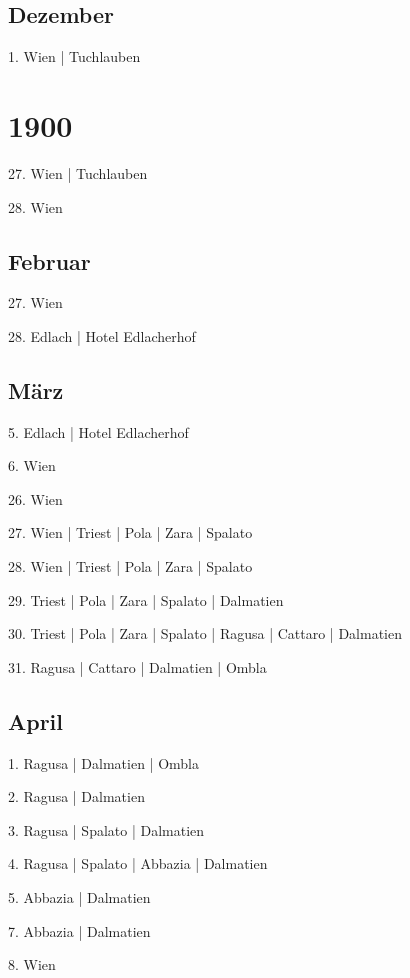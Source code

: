 \documentclass[twoside=false,titlepage=false,open=any, parskip=never, fontsize=10pt, headings=small, chapterprefix=false, appendixprefix=false, DIV=15]{scrbook}
\begin{document}
\begin{multicols}{3}
            \section*{Dezember}
            1. Wien | Tuchlauben\par
            \chapter*{1900}
            27. Wien | Tuchlauben\par
            28. Wien\par
            \section*{Februar}
            27. Wien\par
            28. Edlach | Hotel Edlacherhof\par
            \section*{März}
            5. Edlach | Hotel Edlacherhof\par
            6. Wien\par
            26. Wien\par
            27. Wien | Triest | Pola | Zara | Spalato\par
            28. Wien | Triest | Pola | Zara | Spalato\par
            29. Triest | Pola | Zara | Spalato | Dalmatien\par
            30. Triest | Pola | Zara | Spalato | Ragusa | Cattaro | Dalmatien\par
            31. Ragusa | Cattaro | Dalmatien | Ombla\par
            \section*{April}
            1. Ragusa | Dalmatien | Ombla\par
            2. Ragusa | Dalmatien\par
            3. Ragusa | Spalato | Dalmatien\par
            4. Ragusa | Spalato | Abbazia | Dalmatien\par
            5. Abbazia | Dalmatien\par
            7. Abbazia | Dalmatien\par
            8. Wien\par

\end{multicols}
\end{document}
